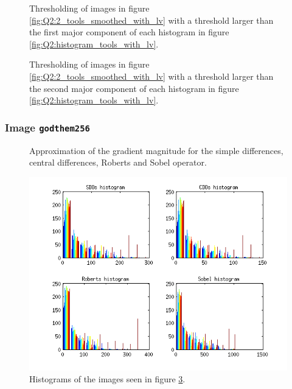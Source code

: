 \begin{figure}[H]
	\centering
	\scalebox{0.9}{}
	\caption{Thresholding of images in figure \ref{fig:Q2:2_tools_smoothed_with_lv} with a threshold larger than the first major component of
	each histogram in figure \ref{fig:Q2:histogram_tools_with_lv}.}
	\label{fig:Q2:threshold_tools_smoothed_1_with_lv}
\end{figure}

\begin{figure}[H]
	\centering
	\scalebox{0.9}{}
	\caption{Thresholding of images in figure \ref{fig:Q2:2_tools_smoothed_with_lv} with a threshold larger than the second major component of
	each histogram in figure \ref{fig:Q2:histogram_tools_with_lv}.}
	\label{fig:Q2:threshold_tools_smoothed_2_with_lv}
\end{figure}




\subsubsection{Image \texttt{godthem256}}

\begin{figure}[H]
	\centering
	\scalebox{0.7}{}
	\caption{Approximation of the gradient magnitude for the simple differences, central differences, Roberts and Sobel operator.}
	\label{fig:Q2:2_house_with_lv}
\end{figure}

\begin{figure}[H]
	\centering
	\includegraphics[scale=0.8]{./images/Q2/with_lv/house/histogram_2.png}
	\caption{Histograms of the images seen in figure \ref{fig:Q2:2_house_with_lv}.}
	\label{fig:Q2:histogram_house_with_lv}
\end{figure}


